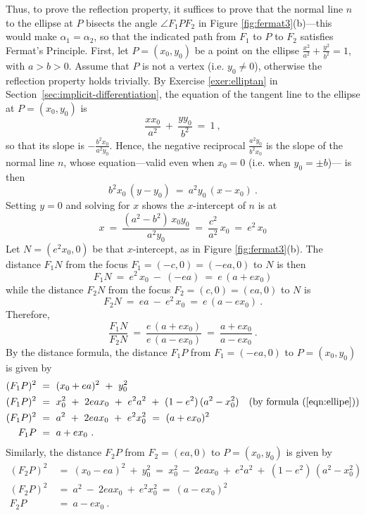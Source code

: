 Thus, to prove the reflection property, it suffices to prove that the normal
line $n$ to the ellipse at $P$ bisects the angle $\angle F_1PF_2$ in Figure
\ref{fig:fermat3}(b)---this would make $\alpha_1=\alpha_2$, so that the
indicated path from $F_1$ to $P$ to $F_2$ satisfies Fermat's Principle. First,
let $P=(x_0,y_0)$ be a point on the ellipse
$\frac{x^2}{a^2} + \frac{y^2}{b^2} = 1$, with $a>b>0$. Assume that $P$ is not a
vertex (i.e. $y_0 \ne 0$), otherwise the reflection property holds trivially.
By Exercise \ref{exer:elliptan} in Section~\ref{sec:implicit-differentiation}, the equation of the tangent line
to the ellipse at $P=(x_0,y_0)$ is
\begin{equation}\label{eqn:elliptan}
 \frac{x x_0}{a^2} ~+~ \frac{y y_0}{b^2} ~=~ 1 ~,
\end{equation}
so that its slope is $-\frac{b^2 x_0}{a^2 y_0}$. Hence, the negative reciprocal
$\frac{a^2 y_0}{b^2 x_0}$ is the slope of the normal line $n$, whose
equation---valid even when $x_0=0$ (i.e. when $y_0=\pm b$)--- is then
\begin{equation}\label{eqn:ellipnormal}
b^2 x_0\,(y - y_0) ~=~ a^2 y_0\,(x - x_0) ~.
\end{equation}
Setting $y=0$ and solving for $x$ shows the $x$-intercept of $n$ is at
\[
x ~=~ \frac{(a^2 - b^2)\,x_0 y_0}{a^2 y_0} ~=~ \frac{c^2}{a^2}\,x_0 ~=~ e^2\,x_0
\]
Let $N = (e^2 x_0,0)$ be that $x$-intercept, as in Figure \ref{fig:fermat3}(b).
The distance $F_1N$ from the focus $F_1 =(-c,0)=(-ea,0)$ to $N$ is then
\[
F_1N ~=~ e^2\,x_0 ~-~ (-ea) ~=~ e\,(a + ex_0)
\]
while the distance $F_2N$ from the focus $F_2 =(c,0)=(ea,0)$ to $N$ is
\[
F_2N ~=~ ea ~-~ e^2\,x_0  ~=~ e\,(a - ex_0) ~.
\]
Therefore,
\[
\frac{F_1N}{F_2N} ~=~ \frac{e\,(a + ex_0)}{e\,(a - ex_0)} ~=~ \frac{a + ex_0}{a - ex_0} ~.
\]
\newpage
\noindent By the distance formula, the distance $F_1P$ from $F_1=(-ea,0)$ to
$P=(x_0,y_0)$ is given by
\begin{align*}
(F_1P)^2 ~&=~ (x_0 + ea)^2 ~+~ y_0^2\\
(F_1P)^2 ~&=~ x_0^2 ~+~ 2eax_0 ~+~ e^2a^2 ~+~ (1-e^2)\,(a^2 - x_0^2)
\quad\text{(by formula (\ref{eqn:ellipe}))}\\
(F_1P)^2 ~&=~ a^2 ~+~ 2eax_0 ~+~ e^2x_0^2 ~=~ (a + ex_0)^2\\
F_1P ~&=~a + ex_0 ~.
\end{align*}
Similarly, the distance $F_2P$ from $F_2=(ea,0)$ to $P=(x_0,y_0)$ is given by
\begin{align*}
(F_2P)^2 ~&=~ (x_0 - ea)^2 ~+~ y_0^2 ~=~ x_0^2 ~-~ 2eax_0 ~+~ e^2a^2 ~+~ (1-e^2)\,(a^2 - x_0^2)\\
(F_2P)^2 ~&=~ a^2 ~-~ 2eax_0 ~+~ e^2x_0^2 ~=~ (a - ex_0)^2\\
F_2P ~&=~a - ex_0 ~.
\end{align*}

